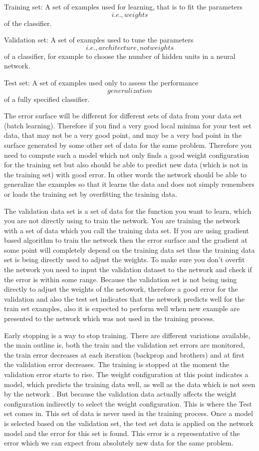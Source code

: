 \documentclass[10pt,a4paper]{ctexbook}
\begin{document}
Training set: A set of examples used for learning, that is to fit the parameters \[i.e., weights\] of the classifier.

Validation set: A set of examples used to tune the parameters \[i.e., architecture, not weights\] of a classifier, for example to choose the number of hidden units in a neural network.

Test set: A set of examples used only to assess the performance \[generalization\] of a fully specified classifier.

The error surface will be different for different sets of data from your data set (batch learning). Therefore if you find a very good local minima for your test set data, that may not be a very good point, and may be a very bad point in the surface generated by some other set of data for the same problem. Therefore you need to compute such a model which not only finds a good weight configuration for the training set but also should be able to predict new data (which is not in the training set) with good error. In other words the network should be able to generalize the examples so that it learns the data and does not simply remembers or loads the training set by overfitting the training data.

The validation data set is a set of data for the function you want to learn, which you are not directly using to train the network. You are training the network with a set of data which you call the training data set. If you are using gradient based algorithm to train the network then the error surface and the gradient at some point will completely depend on the training data set thus the training data set is being directly used to adjust the weights. To make sure you don't overfit the network you need to input the validation dataset to the network and check if the error is within some range. Because the validation set is not being using directly to adjust the weights of the netowork, therefore a good error for the validation and also the test set indicates that the network predicts well for the train set examples, also it is expected to perform well when new example are presented to the network which was not used in the training process.

Early stopping is a way to stop training. There are different variations available, the main outline is, both the train and the validation set errors are monitored, the train error decreases at each iteration (backprop and brothers) and at first the validation error decreases. The training is stopped at the moment the validation error starts to rise. The weight configuration at this point indicates a model, which predicts the training data well, as well as the data which is not seen by the network . But because the validation data actually affects the weight configuration indirectly to select the weight configuration. This is where the Test set comes in. This set of data is never used in the training process. Once a model is selected based on the validation set, the test set data is applied on the network model and the error for this set is found. This error is a representative of the error which we can expect from absolutely new data for the same problem.
\end{document}
